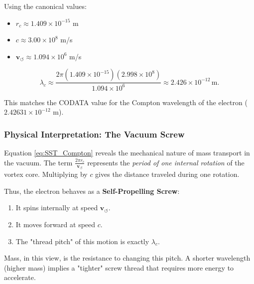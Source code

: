 \documentclass[10pt,reprint,aps,onecolumn,nofootinbib]{revtex4-2}
\begin{document}
        Using the canonical values:
        \begin{itemize}
            \item $r_c \approx 1.409 \times 10^{-15}$ m
            \item $c \approx 3.00 \times 10^8$ m/s
            \item $\mathbf{v}_{\!\boldsymbol{\circlearrowleft}} \approx 1.094 \times 10^6$ m/s
        \end{itemize}

        \begin{equation}
            \lambda_c \approx \frac{2\pi (1.409 \times 10^{-15})(2.998 \times 10^8)}{1.094 \times 10^6}
            \approx 2.426 \times 10^{-12} \, \text{m}.
        \end{equation}

        This matches the CODATA value for the Compton wavelength of the electron
        ($2.42631 \times 10^{-12}$ m).

    \subsubsection*{Physical Interpretation: The Vacuum Screw}

        Equation \eqref{eq:SST_Compton} reveals the mechanical nature of mass
        transport in the vacuum.
        The term $\frac{2\pi r_c}{\mathbf{v}_{\!\boldsymbol{\circlearrowleft}}}$ represents the \emph{period of one internal rotation}
        of the vortex core. Multiplying by $c$ gives the distance traveled
        during one rotation.

        Thus, the electron behaves as a \textbf{Self-Propelling Screw}:
        \begin{enumerate}
            \item It spins internally at speed $\mathbf{v}_{\!\boldsymbol{\circlearrowleft}}$.
            \item It moves forward at speed $c$.
            \item The "thread pitch" of this motion is exactly $\lambda_c$.
        \end{enumerate}

        Mass, in this view, is the resistance to changing this pitch. A shorter
        wavelength (higher mass) implies a "tighter" screw thread that requires
        more energy to accelerate.
\end{document}
